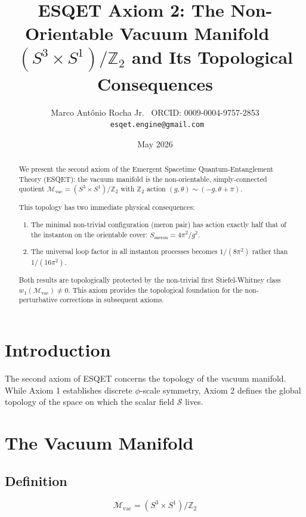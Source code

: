 \documentclass[11pt]{article}
\title{ESQET Axiom 2: The Non-Orientable Vacuum Manifold \
       $(S^3 \times S^1)/\mathbb{Z}_2$ and Its Topological Consequences}
\author{Marco Antônio Rocha Jr. \ 
        ORCID: 0009-0004-9757-2853 \
        \texttt{esqet.engine@gmail.com}}
\date{May 2026}
\begin{document}
\maketitle

\begin{abstract}
We present the second axiom of the Emergent Spacetime Quantum-Entanglement Theory (ESQET): 
the vacuum manifold is the non-orientable, simply-connected quotient 
$\mathcal{M}_{\text{vac}} = (S^3 \times S^1)/\mathbb{Z}_2$ with $\mathbb{Z}_2$ action 
$(g,\theta) \sim (-g, \theta+\pi)$. 

This topology has two immediate physical consequences:
\begin{enumerate}
    \item The minimal non-trivial configuration (meron pair) has action exactly half 
          that of the instanton on the orientable cover: $S_{\text{meron}} = 4\pi^2/g^2$.
    \item The universal loop factor in all instanton processes becomes $1/(8\pi^2)$ 
          rather than $1/(16\pi^2)$.
\end{enumerate}

Both results are topologically protected by the non-trivial first Stiefel-Whitney 
class $w_1(\mathcal{M}_{\text{vac}}) \neq 0$. This axiom provides the topological 
foundation for the non-perturbative corrections in subsequent axioms.
\end{abstract}

\section{Introduction}

The second axiom of ESQET concerns the topology of the vacuum manifold. 
While Axiom 1 establishes discrete $\phi$-scale symmetry, Axiom 2 defines the 
global topology of the space on which the scalar field $\mathcal{S}$ lives.

\section{The Vacuum Manifold}

\subsection{Definition}

\begin{equation}
\boxed{\mathcal{M}_{\text{vac}} = (S^3 \times S^1) / \mathbb{Z}_2}
\end{equation}
\end{document}
